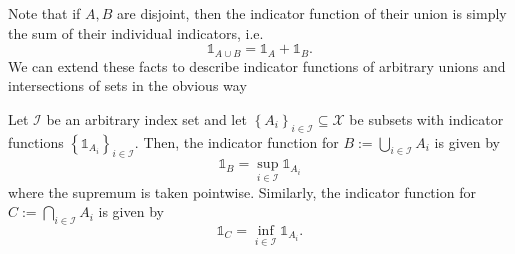 Note that if $A,B$ are disjoint, then the indicator function of their
union is simply the sum of their individual indicators, i.e.
\[
\mathds{1}_{A\cup B}=\mathds{1}_{A}+\mathds{1}_{B}.
\]
We can extend these facts to describe indicator functions of arbitrary
unions and intersections of sets in the obvious way
\begin{prop}
\label{prop:indicatorFunctionsArbitraryOperations}Let $\mathcal{I}$
be an arbitrary index set and let $\left\{ A_{i}\right\} _{i\in\mathcal{I}}\subseteq\mathcal{X}$
be subsets with indicator functions $\left\{ \mathds{1}_{A_{i}}\right\} _{i\in\mathcal{I}}$.
Then, the indicator function for $B:=\bigcup_{i\in\mathcal{I}}A_{i}$
is given by
\[
\mathds{1}_{B}=\sup_{i\in\mathcal{I}}\mathds{1}_{A_{i}}
\]
where the supremum is taken pointwise. Similarly, the indicator function
for $C:=\bigcap_{i\in\mathcal{I}}A_{i}$ is given by
\[
\mathds{1}_{C}=\inf_{i\in\mathcal{I}}\mathds{1}_{A_{i}}.
\]
\end{prop}

